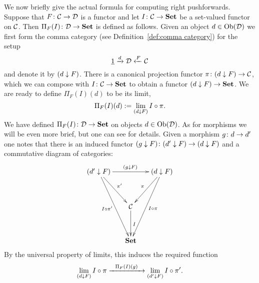 \documentclass[CT4S-EN-RU]{subfiles}
\begin{document}
\begin{blockENG}
We now briefly give the actual formula for computing right pushforwards. Suppose that $F\colon\mathcal{C}\rightarrow\mathcal{D}$ is a functor and let $I\colon\mathcal{C}\rightarrow{\mathbf{Set}}$ be a set-valued functor on $\mathcal{C}$. Then $\Pi_F(I)\colon\mathcal{D}\rightarrow{\mathbf{Set}}$ is defined as follows. Given an object $d\in\textnormal{Ob}(\mathcal{D})$ we first form the comma category (see Definition~\ref{def:comma category}) for the setup
$$\underline{1}\xrightarrow{d}\mathcal{D}\xleftarrow{F}\mathcal{C}$$
and denote it by $(d\downarrow F)$. There is a canonical projection functor $\pi\colon(d\downarrow F)\rightarrow\mathcal{C}$, which we can compose with $I\colon\mathcal{C}\rightarrow{\mathbf{Set}}$ to obtain a functor $(d\downarrow F)\rightarrow{\mathbf{Set}}$. We are ready to define $\Pi_F(I)(d)$ to be its limit,
$$\Pi_F(I)(d):=\lim_{(d\downarrow F)}I\circ\pi.$$
We have defined $\Pi_F(I)\colon\mathcal{D}\rightarrow{\mathbf{Set}}$ on objects $d\in\textnormal{Ob}(\mathcal{D})$. As for morphisms we will be even more brief, but one can see \cite{Sp1} for details. Given a morphism $g\colon d\rightarrow d'$ one notes that there is an induced functor $(g\downarrow F)\colon (d'\downarrow F)\rightarrow(d\downarrow F)$ and a commutative diagram of categories:
$$
\xymatrix@=15pt{
(d'\down F)\ar[rr]^{(g\down F)}\ar[ddr]^{\pi'}\ar[ddddr]_{I\circ\pi'}&&(d\down F)\ar[ddl]_{\pi}\ar[ddddl]^{I\circ\pi}\\\\
&\mcC\ar[dd]^I\\\\
&\Set
}
$$
By the universal property of limits, this induces the required function $$\lim_{(d\downarrow F)}I\circ\pi\xrightarrow{\ \ \Pi_F(I)(g)\ \ }\lim_{(d'\downarrow F)}I\circ\pi'.$$
\end{blockENG}

\begin{blockRUS}
\end{blockRUS}
\end{document}
